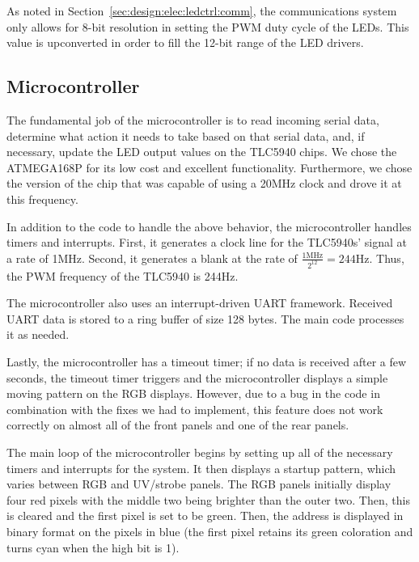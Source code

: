     As noted in Section~\ref{sec:design:elec:ledctrl:comm}, the
    communications system only allows for 8-bit resolution in setting the
    PWM duty cycle of the LEDs.  This value is upconverted in order to fill
    the 12-bit range of the LED drivers.

\subsection{Microcontroller}
    The fundamental job of the microcontroller is to read incoming serial
    data, determine what action it needs to take based on that serial data,
    and, if necessary, update the LED output values on the TLC5940 chips.
    We chose the ATMEGA168P for its low cost and excellent functionality.
    Furthermore, we chose the version of the chip that was capable of using
    a 20MHz clock and drove it at this frequency.

    In addition to the code to handle the above behavior, the
    microcontroller handles timers and interrupts.  First, it
    generates a clock line for the TLC5940s'  signal at a rate
    of 1MHz.  Second, it generates a blank at the rate of
    $\frac{1\textrm{MHz}}{2^{12}}=244\textrm{Hz}$.  Thus, the PWM frequency
    of the TLC5940 is 244Hz.

    The microcontroller also uses an interrupt-driven UART framework.
    Received UART data is stored to a ring buffer of size 128 bytes.  The
    main code processes it as needed.

    Lastly, the microcontroller has a timeout timer; if no data is received
    after a few seconds, the timeout timer triggers and the microcontroller
    displays a simple moving pattern on the RGB displays.  However, due to
    a bug in the code in combination with the fixes we had to implement,
    this feature does not work correctly on almost all of the front panels
    and one of the rear panels.

    The main loop of the microcontroller begins by setting up all of the
    necessary timers and interrupts for the system.  It then displays a
    startup pattern, which varies between RGB and UV/strobe panels.  The
    RGB panels initially display four red pixels with the middle two being
    brighter than the outer two.  Then, this is cleared and the first pixel
    is set to be green.  Then, the address is displayed in binary format on
    the pixels in blue (the first pixel retains its green coloration and
    turns cyan when the high bit is 1).

